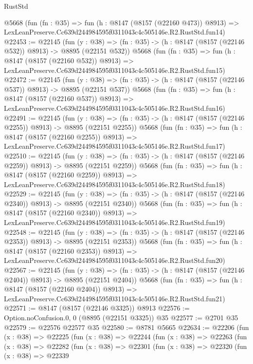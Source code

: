 \begin{lexlean}{RustStd}
\begin{coremodule}
    @5668
    (fun (fn : @35) =>
    fun (h : @8147 (@8157 (@22160 @473)) @8913) =>
    LexLeanPreserve.Cc639d244984595f0311043c4c505146e.R2.RustStd.fun14)
@22453 := @22145
    (fun (y : @38) => (fn : @35) -> (h : @8147 (@8157 (@22146 @532)) @8913) -> @8895 (@22151 @532))
    @5668
    (fun (fn : @35) =>
    fun (h : @8147 (@8157 (@22160 @532)) @8913) =>
    LexLeanPreserve.Cc639d244984595f0311043c4c505146e.R2.RustStd.fun15)
@22472 := @22145
    (fun (y : @38) => (fn : @35) -> (h : @8147 (@8157 (@22146 @537)) @8913) -> @8895 (@22151 @537))
    @5668
    (fun (fn : @35) =>
    fun (h : @8147 (@8157 (@22160 @537)) @8913) =>
    LexLeanPreserve.Cc639d244984595f0311043c4c505146e.R2.RustStd.fun16)
@22491 := @22145
    (fun (y : @38) =>
    (fn : @35) -> (h : @8147 (@8157 (@22146 @2255)) @8913) -> @8895 (@22151 @2255))
    @5668
    (fun (fn : @35) =>
    fun (h : @8147 (@8157 (@22160 @2255)) @8913) =>
    LexLeanPreserve.Cc639d244984595f0311043c4c505146e.R2.RustStd.fun17)
@22510 := @22145
    (fun (y : @38) =>
    (fn : @35) -> (h : @8147 (@8157 (@22146 @2259)) @8913) -> @8895 (@22151 @2259))
    @5668
    (fun (fn : @35) =>
    fun (h : @8147 (@8157 (@22160 @2259)) @8913) =>
    LexLeanPreserve.Cc639d244984595f0311043c4c505146e.R2.RustStd.fun18)
@22529 := @22145
    (fun (y : @38) =>
    (fn : @35) -> (h : @8147 (@8157 (@22146 @2340)) @8913) -> @8895 (@22151 @2340))
    @5668
    (fun (fn : @35) =>
    fun (h : @8147 (@8157 (@22160 @2340)) @8913) =>
    LexLeanPreserve.Cc639d244984595f0311043c4c505146e.R2.RustStd.fun19)
@22548 := @22145
    (fun (y : @38) =>
    (fn : @35) -> (h : @8147 (@8157 (@22146 @2353)) @8913) -> @8895 (@22151 @2353))
    @5668
    (fun (fn : @35) =>
    fun (h : @8147 (@8157 (@22160 @2353)) @8913) =>
    LexLeanPreserve.Cc639d244984595f0311043c4c505146e.R2.RustStd.fun20)
@22567 := @22145
    (fun (y : @38) =>
    (fn : @35) -> (h : @8147 (@8157 (@22146 @2404)) @8913) -> @8895 (@22151 @2404))
    @5668
    (fun (fn : @35) =>
    fun (h : @8147 (@8157 (@22160 @2404)) @8913) =>
    LexLeanPreserve.Cc639d244984595f0311043c4c505146e.R2.RustStd.fun21)
@22571 := @8147 (@8157 (@22146 @3325)) @8913
@22576 := Option.noConfusion.{0, 0} (@8895 (@22151 @3325)) @35
@22577 := @2701 @35
@22579 := @22576 @22577 @35
@22580 := @8781 @5665
@22634 := @22206
    (fun (x : @38) =>
    @22225
      (fun (x : @38) =>
      @22244
        (fun (x : @38) =>
        @22263
          (fun (x : @38) =>
          @22282
            (fun (x : @38) =>
            @22301
              (fun (x : @38) =>
              @22320
                (fun (x : @38) =>
                @22339

\end{coremodule}
\end{lexlean}
